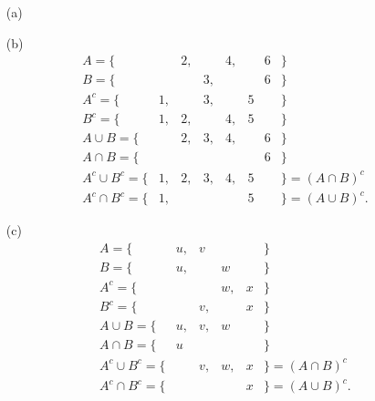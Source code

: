 \documentclass[a4paper]{book}
\newcommand{\C}         {{\mathbb{C}}}
\renewcommand{\:}{\colon}
\newcommand{\ghost}{{\tiny $\color[gray]{1}.$}}
\theoremstyle{definition}
\renewenvironment{solution}{\SolutionInline}{\endSolutionInline}
\begin{document}
\begin{solution}
 \begin{itemize}
 \item[(a)]
  { \def\X{4}\def\A{0.75}\def\B{2.25}\def\C{3.15}\def\D{4.95}\def\Y{0}
  \newcommand{\newset}[2]{%
   \def\Y{-#1}%
   \draw[black,dotted] (0,\Y/2) -- (\X,\Y/2);%
   \draw (6.3,\Y/2) node[anchor=west]{$#2$};%
  }
  \newcommand{\pp}[1]{\fill (#1,\Y/2) circle(0.05);}
  \newcommand{\oo}[2]{\draw[ultra thick,red] (#1+0.09,\Y/2) -- (#2-0.09,\Y/2);}
  \newcommand{\oc}[2]{\draw[ultra thick,red] (#1+0.09,\Y/2) -- (#2,\Y/2); \pp{#2}}
  \newcommand{\co}[2]{\draw[ultra thick,red] (#1,\Y/2) -- (#2-0.09,\Y/2); \pp{#1}}
  \newcommand{\cc}[2]{\draw[ultra thick,red] (#1,\Y/2) -- (#2,\Y/2); \pp{#1}\pp{#2}}
  \begin{center}
  \end{center}}
  \item[(b)] \ghost \vspace{-3ex}
   \[ \begin{array}{rlllllll}
    A=          \{ &   & 2,&   & 4,&   & 6 &\} \\
    B=          \{ &   &   & 3,&   &   & 6 &\} \\
    A^c=        \{ & 1,&   & 3,&   & 5 &   &\} \\
    B^c=        \{ & 1,& 2,&   & 4,& 5 &   &\} \\
    A\cup B=    \{ &   & 2,& 3,& 4,&   & 6 &\} \\
    A\cap B=    \{ &   &   &   &   &   & 6 &\} \\
    A^c\cup B^c=\{ & 1,& 2,& 3,& 4,& 5 &   &\}=(A\cap B)^c \\
    A^c\cap B^c=\{ & 1,&   &   &   & 5 &   &\}=(A\cup B)^c.
   \end{array} \]
  \item[(c)] \ghost \vspace{-3ex}
   \[ \begin{array}{rlllll}
    A=          \{ & u,& v &   &   &\} \\
    B=          \{ & u,&   & w &   &\} \\
    A^c=        \{ &   &   & w,& x &\} \\
    B^c=        \{ &   & v,&   & x &\} \\
    A\cup B=    \{ & u,& v,& w &   &\} \\
    A\cap B=    \{ & u &   &   &   &\} \\
    A^c\cup B^c=\{ &   & v,& w,& x &\}=(A\cap B)^c \\
    A^c\cap B^c=\{ &   &   &   & x &\}=(A\cup B)^c.
   \end{array} \]
 \end{itemize}
\end{solution}
\end{document}
